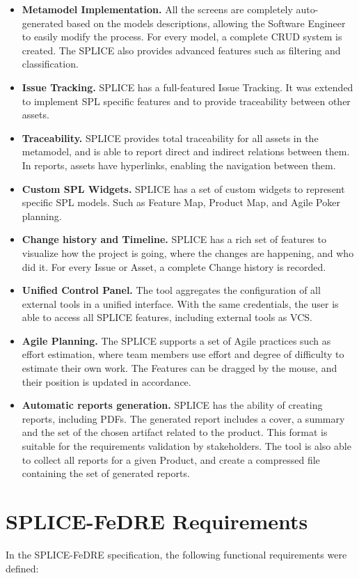 \begin{itemize}
\item  \textbf{Metamodel Implementation.} All the screens are completely
auto-generated based on the models descriptions, allowing the Software Engineer to 
easily modify the process. For every model, a complete \acf{CRUD} system is
created. The \ac{SPLICE} also provides advanced features such as filtering and classification.
\item  \textbf{Issue Tracking.} \ac{SPLICE} has a full-featured Issue Tracking. It
was extended to implement \ac{SPL} specific features and to provide traceability between other assets.
\item  \textbf{Traceability.} \ac{SPLICE} provides total traceability for all assets
in the metamodel, and is able to report direct and indirect relations between them. In reports, assets 
have hyperlinks, enabling the navigation between them.
\item  \textbf{Custom SPL Widgets.} \ac{SPLICE} has a set of custom widgets to
represent specific \ac{SPL} models. Such as Feature Map, Product Map, and Agile Poker planning.
\item  \textbf{Change history and Timeline.} \ac{SPLICE} has a rich set of features
to visualize how the project is going, where the changes are happening, and who did it. For every 
Issue or Asset, a complete Change history is recorded.
\item  \textbf{Unified Control Panel.} The tool aggregates the configuration of
all external tools in a unified interface. With the same credentials, the user is able to access all 
\ac{SPLICE} features, including external tools as \acf{VCS}.
\item  \textbf{Agile Planning.} The \ac{SPLICE} supports a set of Agile practices
such as effort estimation, where team members use effort and degree of difficulty to estimate 
their own work. The Features can be dragged by the mouse, and their position is updated in accordance.
\item  \textbf{Automatic reports generation.} \ac{SPLICE} has the ability of creating
reports, including PDFs. The generated report includes a cover, a summary and the set of 
the chosen artifact related to the product. This format is suitable for the requirements 
validation by stakeholders. The tool is also able to collect all reports for a given Product, and 
create a compressed file containing the set of generated reports.
\end{itemize}

\section{SPLICE-FeDRE Requirements}
\label{sc:requirements}
In the SPLICE-FeDRE specification, the following functional requirements were
defined:

